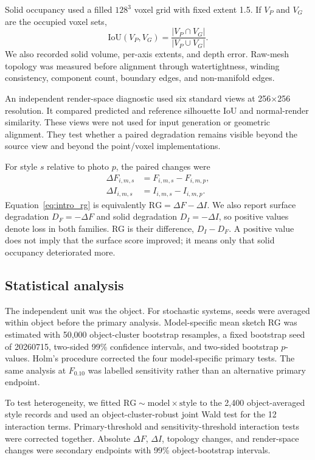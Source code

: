 \documentclass[12pt,a4paper]{article}
\begin{document}
Solid occupancy used a filled $128^3$ voxel grid with fixed extent 1.5. If $V_P$ and $V_G$ are the occupied voxel sets,
\begin{equation}
\mathrm{IoU}(V_P,V_G)
=
\frac{|V_P\cap V_G|}{|V_P\cup V_G|}.
\label{eq:iou}
\end{equation}
We also recorded solid volume, per-axis extents, and depth error. Raw-mesh topology was measured before alignment through watertightness, winding consistency, component count, boundary edges, and non-manifold edges.

An independent render-space diagnostic used six standard views at 256$\times$256 resolution. It compared predicted and reference silhouette IoU and normal-render similarity. These views were not used for input generation or geometric alignment. They test whether a paired degradation remains visible beyond the source view and beyond the point/voxel implementations.

For style $s$ relative to photo $p$, the paired changes were
\begin{align}
\Delta F_{i,m,s} &= F_{i,m,s}-F_{i,m,p}, \\
\Delta I_{i,m,s} &= I_{i,m,s}-I_{i,m,p}.
\end{align}
Equation~\ref{eq:intro_rg} is equivalently $\mathrm{RG}=\Delta F-\Delta I$. We also report surface degradation $D_F=-\Delta F$ and solid degradation $D_I=-\Delta I$, so positive values denote loss in both families. RG is their difference, $D_I-D_F$. A positive value does not imply that the surface score improved; it means only that solid occupancy deteriorated more.

\subsection{Statistical analysis}

The independent unit was the object. For stochastic systems, seeds were averaged within object before the primary analysis. Model-specific mean sketch RG was estimated with 50,000 object-cluster bootstrap resamples, a fixed bootstrap seed of 20260715, two-sided 99\% confidence intervals, and two-sided bootstrap $p$-values. Holm's procedure corrected the four model-specific primary tests. The same analysis at $F_{0.10}$ was labelled sensitivity rather than an alternative primary endpoint.

To test heterogeneity, we fitted $\mathrm{RG}\sim\mathrm{model}\times\mathrm{style}$ to the 2,400 object-averaged style records and used an object-cluster-robust joint Wald test for the 12 interaction terms. Primary-threshold and sensitivity-threshold interaction tests were corrected together. Absolute $\Delta F$, $\Delta I$, topology changes, and render-space changes were secondary endpoints with 99\% object-bootstrap intervals.
\end{document}
